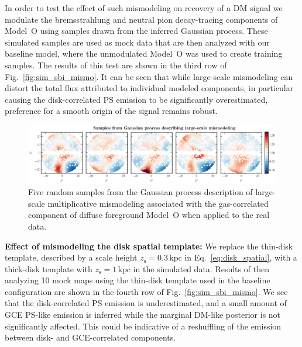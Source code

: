 \documentclass[prd,aps,10pt,nofootinbib,twocolumn,superscriptaddress,preprintnumbers,balancelastpage,longbibliography,floatfix]{revtex4-2}
\begin{document}
In order to test the effect of such mismodeling on recovery of a DM signal we modulate the bremsstrahlung and neutral pion decay-tracing components of {Model~O} using samples drawn from the inferred Gaussian process. These simulated samples are used as mock data that are then analyzed with our baseline model, where the unmodulated {Model~O} was used to create training samples.
The results of this test are shown in the third row of Fig.~\ref{fig:sim_sbi_mismo}. It can be seen that while large-scale mismodeling can distort the total flux attributed to individual modeled components, in particular causing the disk-correlated PS emission to be significantly overestimated, preference for a smooth origin of the signal remains robust. \\

%
\begin{figure}[t]
\centering
\includegraphics[width=1.\textwidth]{dd_mismo_map.pdf}
\caption{Five random samples from the Gaussian process description of large-scale multiplicative mismodeling associated with the gas-correlated component of diffuse foreground {Model~O} when applied to the real \Fermi data.}
\label{fig:dd_mismo_map}
\end{figure}
%

\noindent
\textbf{Effect of mismodeling the disk spatial template:} 
We replace the thin-disk template, described by a scale height $z_\mathrm{s} = 0.3\,\mathrm{kpc}$ in Eq.~\eqref{eq:disk_spatial}, with a thick-disk template with $z_\mathrm{s} = 1\,\mathrm{kpc}$ in the simulated data. Results of then analyzing 10 mock maps using the thin-disk template used in the baseline configuration are shown in the fourth row of Fig.~\ref{fig:sim_sbi_mismo}. We see that the disk-correlated PS emission is underestimated, and a small amount of GCE PS-like emission is inferred while the marginal DM-like posterior is not significantly affected. This could be indicative of a reshuffling of the emission between disk- and GCE-correlated components. \\
\end{document}
